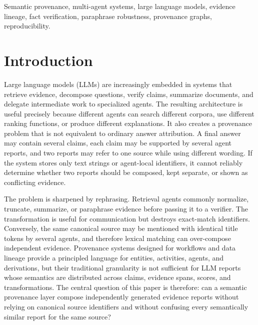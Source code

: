 \documentclass{ieeeaccess}
\begin{document}
\begin{keywords}
Semantic provenance, multi-agent systems, large language models, evidence lineage, fact verification, paraphrase robustness, provenance graphs, reproducibility.
\end{keywords}

\titlepgskip=-15pt
\maketitle

\section{Introduction}
Large language models (LLMs) are increasingly embedded in systems that retrieve evidence, decompose questions, verify claims, summarize documents, and delegate intermediate work to specialized agents. The resulting architecture is useful precisely because different agents can search different corpora, use different ranking functions, or produce different explanations. It also creates a provenance problem that is not equivalent to ordinary answer attribution. A final answer may contain several claims, each claim may be supported by several agent reports, and two reports may refer to one source while using different wording. If the system stores only text strings or agent-local identifiers, it cannot reliably determine whether two reports should be composed, kept separate, or shown as conflicting evidence.

The problem is sharpened by rephrasing. Retrieval agents commonly normalize, truncate, summarize, or paraphrase evidence before passing it to a verifier. The transformation is useful for communication but destroys exact-match identifiers. Conversely, the same canonical source may be mentioned with identical title tokens by several agents, and therefore lexical matching can over-compose independent evidence. Provenance systems designed for workflows and data lineage provide a principled language for entities, activities, agents, and derivations, but their traditional granularity is not sufficient for LLM reports whose semantics are distributed across claims, evidence spans, scores, and transformations. The central question of this paper is therefore: can a semantic provenance layer compose independently generated evidence reports without relying on canonical source identifiers and without confusing every semantically similar report for the same source?
\end{document}
